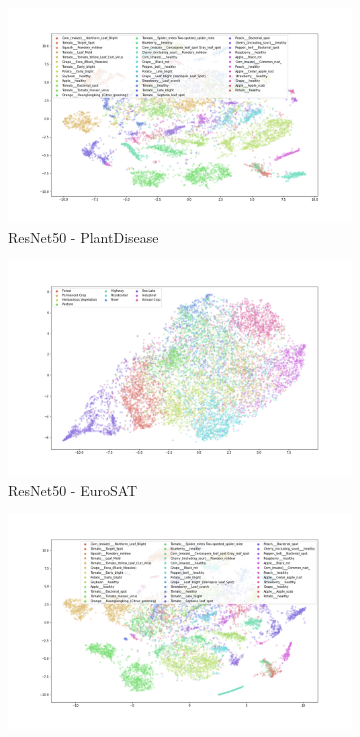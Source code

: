 \documentclass{article}
\theoremstyle{definition}
\begin{document}
\begin{figure}[h!]
    \centering
    \begin{subfigure}{.48\textwidth}
        \includegraphics[width=\linewidth]{Final project/img/PlantDisease_RESNET50.png}
        \caption{ResNet50 - PlantDisease}
    \end{subfigure}
    \begin{subfigure}{.48\textwidth}
        \includegraphics[width=\linewidth]{Final project/img/EuroSAT_RESNET50.png}
        \caption{ResNet50 - EuroSAT}
    \end{subfigure}
    \begin{subfigure}{.48\textwidth}
        \includegraphics[width=\linewidth]{Final project/img/PlantDisease_clip-vit-base-patch32.png}

\end{subfigure}
\end{figure}
\end{document}
